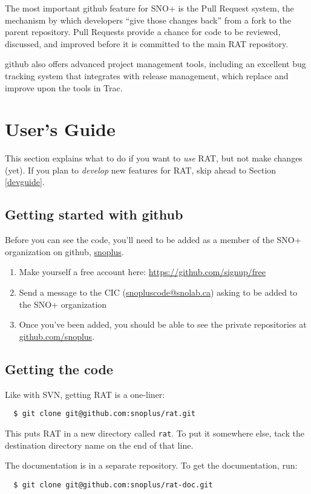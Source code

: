 \documentclass{article}
\begin{document}
The most important github feature for SNO+ is the Pull Request system, the mechanism by which developers ``give those changes back'' from a fork to the parent repository. Pull Requests provide a chance for code to be reviewed, discussed, and improved before it is committed to the main RAT repository.

github also offers advanced project management tools, including an excellent bug tracking system that integrates with release management, which replace and improve upon the tools in Trac.
\section{User's Guide}
This section explains what to do if you want to {\it use} RAT, but not make changes (yet). If you plan to {\it develop} new features for RAT, skip ahead to Section \ref{devguide}.
\subsection{Getting started with github}
\label{get-started}
Before you can see the code, you'll need to be added as a member of the SNO+ organization on github, \href{http://github.com/snoplus}{snoplus}.
\begin{enumerate}
\item Make yourself a free account here: \href{https://github.com/signup/free}{https://github.com/signup/free}
\item Send a message to the CIC (\href{mailto:snopluscode@snolab.ca}{snopluscode@snolab.ca}) asking to be added to the SNO+ organization
\item Once you've been added, you should be able to see the private repositories at \href{http://github.com/snoplus}{github.com/snoplus}.
\end{enumerate}

\subsection{Getting the code}
Like with SVN, getting RAT is a one-liner:
\begin{verbatim}
  $ git clone git@github.com:snoplus/rat.git
\end{verbatim}
This puts RAT in a new directory called {\tt rat}. To put it somewhere else, tack the destination directory name on the end of that line.

The documentation is in a separate repository. To get the documentation, run:
\begin{verbatim}
  $ git clone git@github.com:snoplus/rat-doc.git
\end{verbatim}
\end{document}

